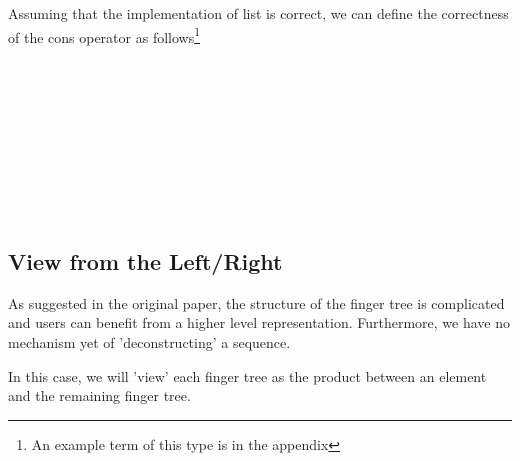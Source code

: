 \documentclass[12pt,twoside,notitlepage]{report}
\begin{document}
Assuming that the implementation of list is correct, we can define the correctness of the cons operator as follows\footnote{An example term of this type is in the appendix}

\begin{code}
\\
\> \AgdaSymbol{:}  \AgdaSymbol{\{}\AgdaSymbol{\}\{} \AgdaSymbol{:}  \AgdaSymbol{\}\{} \AgdaSymbol{:}   \AgdaSymbol{\}}\<%
\\
\>[6]\<[8]%
\>[8]  \AgdaSymbol{:}   \<%
\\
\>[6]\<[8]%
\>[8]  \AgdaSymbol{:}    \<%
\\
\>[6]\<[8]%
\>[8]\AgdaSymbol{\{} \AgdaSymbol{:} \AgdaSymbol{\}} \<%
\\
\>[6]\<[8]%
\>[8]\AgdaSymbol{(} \AgdaSymbol{:} \AgdaSymbol{)} \<%
\\
\>[6]\<[8]%
\>[8]\AgdaSymbol{(} \AgdaSymbol{:}    \AgdaSymbol{\{}\AgdaSymbol{\})} \<%
\\
\>[6]\<[8]%
\>[8] \AgdaSymbol{(}  \AgdaSymbol{)}  \AgdaSymbol{(}  \AgdaInductiveConstructor{[]}\AgdaSymbol{)} \AgdaFunction{++} \AgdaSymbol{(} \AgdaSymbol{)}\<%
\\
\end{code} 

\subsection{View from the Left/Right}

As suggested in the original paper, the structure of the finger tree is complicated and users can benefit from a higher level representation. Furthermore, we have no mechanism yet of 'deconstructing' a sequence.

In this case, we will 'view' each finger tree as the product between an element and the remaining finger tree. 
\end{document}
